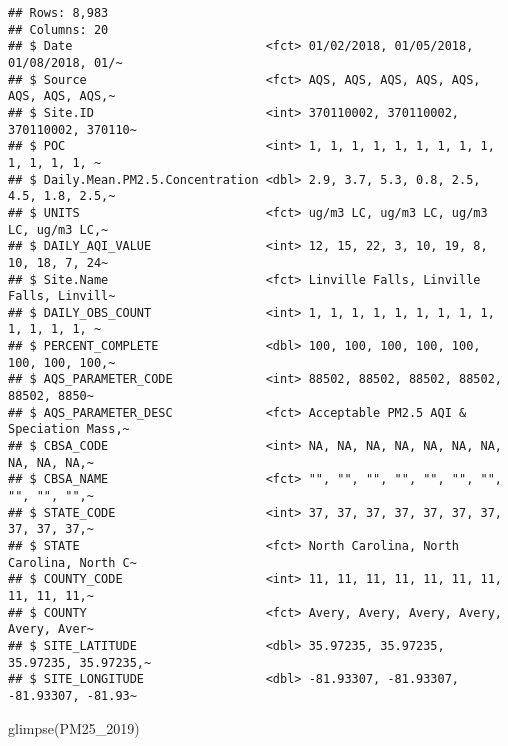 \documentclass[
]{article}
\newenvironment{Shaded}{\begin{snugshade}}{\end{snugshade}}
\newcommand{\FunctionTok}[1]{\textcolor[rgb]{0.00,0.00,0.00}{#1}}
\newcommand{\NormalTok}[1]{#1}
\begin{document}
\begin{verbatim}
## Rows: 8,983
## Columns: 20
## $ Date                           <fct> 01/02/2018, 01/05/2018, 01/08/2018, 01/~
## $ Source                         <fct> AQS, AQS, AQS, AQS, AQS, AQS, AQS, AQS,~
## $ Site.ID                        <int> 370110002, 370110002, 370110002, 370110~
## $ POC                            <int> 1, 1, 1, 1, 1, 1, 1, 1, 1, 1, 1, 1, 1, ~
## $ Daily.Mean.PM2.5.Concentration <dbl> 2.9, 3.7, 5.3, 0.8, 2.5, 4.5, 1.8, 2.5,~
## $ UNITS                          <fct> ug/m3 LC, ug/m3 LC, ug/m3 LC, ug/m3 LC,~
## $ DAILY_AQI_VALUE                <int> 12, 15, 22, 3, 10, 19, 8, 10, 18, 7, 24~
## $ Site.Name                      <fct> Linville Falls, Linville Falls, Linvill~
## $ DAILY_OBS_COUNT                <int> 1, 1, 1, 1, 1, 1, 1, 1, 1, 1, 1, 1, 1, ~
## $ PERCENT_COMPLETE               <dbl> 100, 100, 100, 100, 100, 100, 100, 100,~
## $ AQS_PARAMETER_CODE             <int> 88502, 88502, 88502, 88502, 88502, 8850~
## $ AQS_PARAMETER_DESC             <fct> Acceptable PM2.5 AQI & Speciation Mass,~
## $ CBSA_CODE                      <int> NA, NA, NA, NA, NA, NA, NA, NA, NA, NA,~
## $ CBSA_NAME                      <fct> "", "", "", "", "", "", "", "", "", "",~
## $ STATE_CODE                     <int> 37, 37, 37, 37, 37, 37, 37, 37, 37, 37,~
## $ STATE                          <fct> North Carolina, North Carolina, North C~
## $ COUNTY_CODE                    <int> 11, 11, 11, 11, 11, 11, 11, 11, 11, 11,~
## $ COUNTY                         <fct> Avery, Avery, Avery, Avery, Avery, Aver~
## $ SITE_LATITUDE                  <dbl> 35.97235, 35.97235, 35.97235, 35.97235,~
## $ SITE_LONGITUDE                 <dbl> -81.93307, -81.93307, -81.93307, -81.93~
\end{verbatim}

\begin{Shaded}
\begin{Highlighting}[]
\FunctionTok{glimpse}\NormalTok{(PM25\_2019)}
\end{Highlighting}
\end{Shaded}
\end{document}
